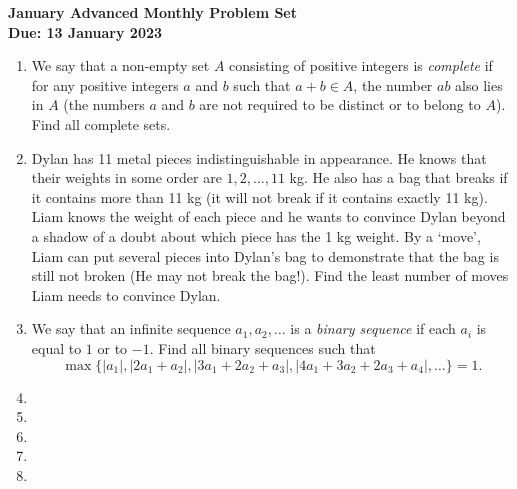 \documentclass{article}
\newcommand{\abs}[1]{\left|#1\right|}
\begin{document}
\thispagestyle{empty}

\begin{center}
  \textbf{\Large January Advanced Monthly Problem Set}
  \\ \vspace{1em}
  \textbf{\large Due: 13 January 2023}
\end{center}

\bigskip \bigskip

\begin{enumerate}[itemsep=\fill]

 
\item %
We say that a non-empty set $A$ consisting of positive integers is \textit{complete} if for any positive integers $a$ and $b$ such that $a+b\in A$, the number $ab$ also lies in $A$ (the numbers $a$ and $b$ are not required to be distinct or to belong to $A$). Find all complete sets.


\item %
Dylan has 11 metal pieces indistinguishable in appearance. He knows that their weights in some order are $1,2,...,11$ kg. He also has a bag that breaks if it contains more than 11 kg (it will not break if it contains exactly 11 kg). Liam knows the weight of each piece and he wants to convince Dylan beyond a shadow of a doubt about which piece has the 1 kg weight. By a `move', Liam can put several pieces into Dylan's bag to demonstrate that the bag is still not broken (He may not break the bag!). Find the least number of moves Liam needs to convince Dylan.


\item %
We say that an infinite sequence $a_1, a_2, \dotsc$ is a \emph{binary sequence} if each $a_i$ is equal to $1$ or to $-1$.
Find all binary sequences such that \[ \max\{\abs{a_1}, \abs{2a_1+a_2}, \abs{3a_1+2a_2+a_3}, \abs{4a_1+3a_2+2a_3+a_4}, \dotsc\} = 1. \]

\item %



\item %



\item %


\item %


\item %

\end{enumerate}
\end{document}
